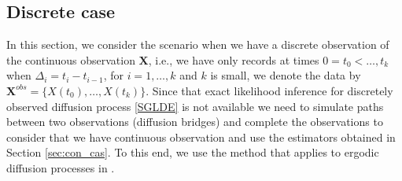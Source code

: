 \documentclass[12pt, reqno]{amsart}
\newcommand{\1}{{\bf 1}}
\newcommand{\2}{{\bf 2}}
\theoremstyle{definition}
\theoremstyle{remark}
\numberwithin{equation}{section}
\begin{document}
 
 
 


\subsection{Discrete case}\label{sec:dis_case}
 In this section, we consider the scenario when we have a discrete observation of the continuous observation $\bm X$, i.e., we have only records at times $0=t_0<\ldots,t_k$ when $\Delta_i=t_i-t_{i-1}$, for $i=1,\ldots,k$ and $k$ is small, we denote the data by $\bm{X}^{obs}=\{X(t_0),\ldots, X(t_k)\}$. Since that exact likelihood inference for discretely observed diffusion process \eqref{SGLDE} is not available we need to simulate paths between two observations (diffusion bridges) and complete the observations to consider that we have continuous observation and use the estimators obtained in Section \ref{sec:con_cas}.  To this end, we use the method that applies to ergodic diffusion processes in \cite{bl-so-14}.
\end{document}
